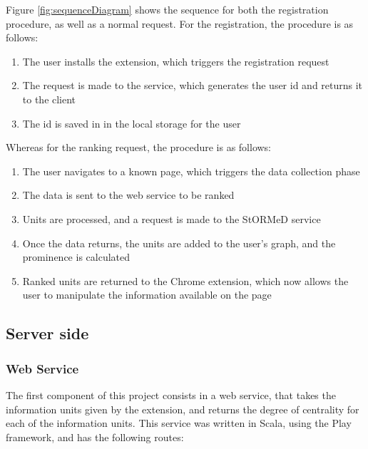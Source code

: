 Figure \ref{fig:sequenceDiagram} shows the sequence for both the registration procedure, as well as a normal request. For the registration, the procedure is as follows:
\begin{enumerate}
\item The user installs the extension, which triggers the registration request
\item The request is made to the service, which generates the user id and returns it to the client
\item The id is saved in in the local storage for the user
\end{enumerate}

\noindent Whereas for the ranking request, the procedure is as follows:
\begin{enumerate}
\item The user navigates to a known page, which triggers the data collection phase
\item The data is sent to the web service to be ranked
\item Units are processed, and a request is made to the StORMeD service
\item Once the data returns, the units are added to the user's graph, and the prominence is calculated
\item Ranked units are returned to the Chrome extension, which now allows the user to manipulate the information available on the page
\end{enumerate}

\subsection{Server side}
\subsubsection{Web Service}
The first component of this project consists in a web service, that takes the information units given by the extension, and returns the degree of centrality for each of the information units. This service was written in Scala, using the Play framework, and has the following routes:

